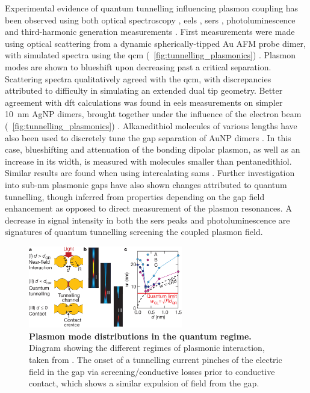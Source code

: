 \documentclass{article}
\begin{document}
Experimental evidence of quantum tunnelling influencing plasmon coupling has been observed using both optical spectroscopy \cite{savage2012, cha2014, zhu2014}, \gls{eels} \cite{scholl2013}, \gls{sers} \cite{zhu2014}, photoluminescence \cite{kravtsov2014} and third-harmonic generation measurements \cite{hajisalem2014}.
First measurements were made using optical scattering from a dynamic spherically-tipped Au AFM probe dimer, with simulated spectra using the \gls{qcm} (\figurename~\ref{fig:tunnelling_plasmonics}) \cite{savage2012}. Plasmon modes are shown to blueshift upon decreasing past a critical separation. Scattering spectra qualitatively agreed with the \gls{qcm}, with discrepancies attributed to difficulty in simulating an extended dual tip geometry. Better agreement with \gls{dft} calculations was found in \gls{eels} measurements on simpler \SI{10}{nm} AgNP dimers, brought together under the influence of the electron beam (\figurename~\ref{fig:tunnelling_plasmonics}) \cite{scholl2013}.
Alkanedithiol molecules of various lengths have also been used to discretely tune the gap separation of AuNP dimers \cite{cha2014}. In this case, blueshifting and attenuation of the bonding dipolar plasmon, as well as an increase in its width, is measured with molecules smaller than pentanedithiol. Similar results are found when using intercalating \glspl{sam} \cite{tan2014}.
Further investigation into sub-nm plasmonic gaps have also shown changes attributed to quantum tunnelling, though inferred from properties depending on the gap field enhancement as opposed to direct measurement of the plasmon resonances. A decrease in signal intensity in both the \gls{sers} peaks \cite{zhu2014} and photoluminescence \cite{kravtsov2014} are signatures of quantum tunnelling screening the coupled plasmon field.

\begin{figure}[bt]
\centering
\includegraphics[width=0.6\textwidth]{figures/literature/nature11653-f3_2}
\caption[Plasmon mode distributions in the quantum regime]{\textbf{Plasmon mode distributions in the quantum regime.} Diagram showing the different regimes of plasmonic interaction, taken from \cite{savage2012}. The onset of a tunnelling current pinches of the electric field in the gap via screening/conductive losses prior to conductive contact, which shows a similar expulsion of field from the gap.}
\label{fig:savage2012c}
\end{figure}
\end{document}

